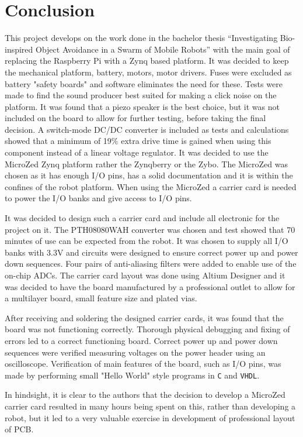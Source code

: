 \section{Conclusion}
This project develops on the work done in the bachelor thesis ``Investigating Bio-inspired Object Avoidance in a Swarm of Mobile Robots'' with the main goal of replacing the Raspberry Pi with a Zynq based platform.
It was decided to keep the mechanical platform, battery, motors, motor drivers.
Fuses were excluded as battery "safety boards" and software eliminates the need for these.
Tests were made to find the sound producer best suited for making a click noise on the platform.
It was found that a piezo speaker is the best choice, but it was not included on the board to allow for further testing, before taking the final decision.
A switch-mode DC/DC converter is included as tests and calculations showed that a minimum of 19\% extra drive time is gained when using this component instead of a linear voltage regulator.
It was decided to use the MicroZed Zynq platform rather the Zynqberry or the Zybo.
The MicroZed was chosen as it has enough I/O pins, has a solid documentation and it is within the confines of the robot platform.
When using the MicroZed a carrier card is needed to power the I/O banks and give access to I/O pins.

It was decided to design such a carrier card and include all electronic for the project on it. 
The PTH08080WAH converter was chosen and test showed that 70 minutes of use can be expected from the robot.
It was chosen to supply all I/O banks with 3.3V and circuits were designed to ensure correct power up and power down sequences. 
Four pairs of anti-aliasing filters were added to enable use of the on-chip ADCs. 
The carrier card layout was done using Altium Designer and it was decided to have the board manufactured by a professional outlet to allow for a multilayer board, small feature size and plated vias.

After receiving and soldering the designed carrier cards, it was found that the board was not functioning correctly.
Thorough physical debugging and fixing of errors led to a correct functioning board. 
Correct power up and power down sequences were verified measuring voltages on the power header using an oscilloscope. 
Verification of main features of the board, such as I/O pins, was made by performing small "Hello World" style programs in \texttt{C} and \texttt{VHDL}.

In hindsight, it is clear to the authors that the decision to develop a MicroZed carrier card resulted in many hours being spent on this, rather than developing a robot, but it led to a very valuable exercise in development of professional layout of PCB. 